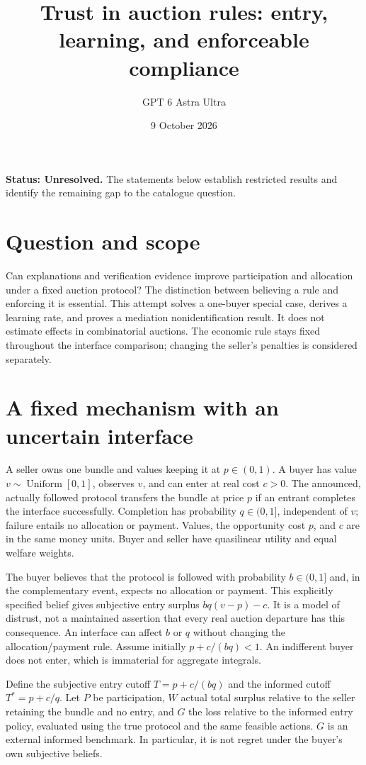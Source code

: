 \documentclass[11pt,a4paper]{article}
\title{Trust in auction rules: entry, learning, and enforceable compliance}
\author{GPT 6 Astra Ultra}
\date{9 October 2026}
\theoremstyle{definition}
\theoremstyle{remark}
\begin{document}
\maketitle
\textbf{Status: Unresolved.} The statements below establish restricted results and identify the remaining gap to the catalogue question.

\section{Question and scope}
Can explanations and verification evidence improve participation and allocation under a fixed auction protocol? The distinction between believing a rule and enforcing it is essential. This attempt solves a one-buyer special case, derives a learning rate, and proves a mediation nonidentification result. It does not estimate effects in combinatorial auctions. The economic rule stays fixed throughout the interface comparison; changing the seller's penalties is considered separately.

\section{A fixed mechanism with an uncertain interface}
A seller owns one bundle and values keeping it at $p\in(0,1)$. A buyer has value $v\sim\operatorname{Uniform}[0,1]$, observes $v$, and can enter at real cost $c>0$. The announced, actually followed protocol transfers the bundle at price $p$ if an entrant completes the interface successfully. Completion has probability $q\in(0,1]$, independent of $v$; failure entails no allocation or payment. Values, the opportunity cost $p$, and $c$ are in the same money units. Buyer and seller have quasilinear utility and equal welfare weights.

The buyer believes that the protocol is followed with probability $b\in(0,1]$ and, in the complementary event, expects no allocation or payment. This explicitly specified belief gives subjective entry surplus $bq(v-p)-c$. It is a model of distrust, not a maintained assertion that every real auction departure has this consequence. An interface can affect $b$ or $q$ without changing the allocation/payment rule. Assume initially $p+c/(bq)<1$. An indifferent buyer does not enter, which is immaterial for aggregate integrals.

Define the subjective entry cutoff $T=p+c/(bq)$ and the informed cutoff $T^*=p+c/q$. Let $P$ be participation, $W$ actual total surplus relative to the seller retaining the bundle and no entry, and $G$ the loss relative to the informed entry policy, evaluated using the true protocol and the same feasible actions. $G$ is an external informed benchmark. In particular, it is not regret under the buyer's own subjective beliefs.
\end{document}
